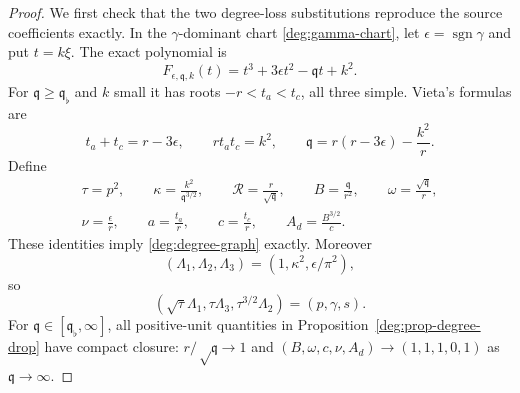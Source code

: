 \begin{proof}
We first check that the two degree-loss substitutions reproduce the
source coefficients exactly.  In the \(\gamma\)-dominant
chart \eqref{deg:gamma-chart}, let
\(\epsilon=\operatorname {sgn}\gamma\) and put \(t=k\xi\).
The exact polynomial is
\begin{equation}
 F_{\epsilon,\mathfrak q,k}(t)=t^3+3\epsilon t^2-\mathfrak q t+k^2.
 \label{deg:gamma-degree-polynomial}
\end{equation}
For \(\mathfrak q\ge \mathfrak q_\flat\) and \(k\) small it has roots
\(-r<t_a<t_c\), all three simple.  Vieta's formulas are
\[
 t_a+t_c=r-3\epsilon,\qquad
 rt_at_c=k^2,\qquad
 \mathfrak q=r(r-3\epsilon)-\frac{k^2}{r}.
\]
Define
\begin{equation}
 \begin{gathered}
 \tau=p^2,\qquad
 \kappa=\frac{k^2}{\mathfrak q^{3/2}},\qquad
 \mathcal R=\frac{r}{\sqrt{\mathfrak q}},\qquad
 B=\frac{\mathfrak q}{r^2},\qquad \omega=\frac{\sqrt{\mathfrak q}}{r},\\
 \nu=\frac{\epsilon}{r},\qquad
 a=\frac{t_a}{r},\qquad c=\frac{t_c}{r},\qquad
 A_d=\frac{B^{3/2}}{c}.
 \end{gathered}
 \label{deg:gamma-degree-dictionary}
\end{equation}
These identities imply \eqref{deg:degree-graph} exactly.  Moreover
\[
 (\Lambda_1,\Lambda_2,\Lambda_3)
 =(1,\kappa^2,\epsilon/\pi^2),
\]
so
\[
 (\sqrt\tau\Lambda_1,\tau\Lambda_3,\tau^{3/2}\Lambda_2)
 =(p,\gamma,s).
\]
For \(\mathfrak q\in[\mathfrak q_\flat,\infty]\), all positive-unit quantities in
Proposition~\ref{deg:prop-degree-drop} have compact closure:
\(r/\sqrt \mathfrak q\to1\) and
\((B,\omega,c,\nu,A_d)\to(1,1,1,0,1)\) as \(\mathfrak q\to\infty\).


\end{proof}
